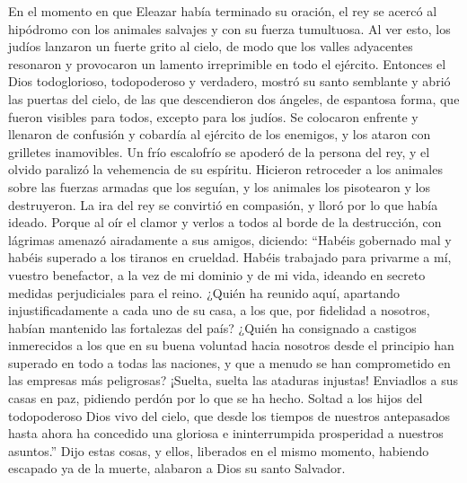  En el momento en que Eleazar había terminado su oración,
el rey se acercó al hipódromo con los animales salvajes y con su fuerza
tumultuosa.  Al ver esto, los judíos lanzaron un fuerte
grito al cielo, de modo que los valles adyacentes resonaron y provocaron
un lamento irreprimible en todo el ejército.  Entonces el
Dios todoglorioso, todopoderoso y verdadero, mostró su santo semblante y
abrió las puertas del cielo, de las que descendieron dos ángeles, de
espantosa forma, que fueron visibles para todos, excepto para los
judíos.  Se colocaron enfrente y llenaron de confusión y
cobardía al ejército de los enemigos, y los ataron con grilletes
inamovibles.  Un frío escalofrío se apoderó de la persona
del rey, y el olvido paralizó la vehemencia de su espíritu.
 Hicieron retroceder a los animales sobre las fuerzas
armadas que los seguían, y los animales los pisotearon y los
destruyeron.  La ira del rey se convirtió en compasión, y
lloró por lo que había ideado.  Porque al oír el clamor y
verlos a todos al borde de la destrucción, con lágrimas amenazó
airadamente a sus amigos, diciendo:  ``Habéis gobernado
mal y habéis superado a los tiranos en crueldad. Habéis trabajado para
privarme a mí, vuestro benefactor, a la vez de mi dominio y de mi vida,
ideando en secreto medidas perjudiciales para el reino. 
¿Quién ha reunido aquí, apartando injustificadamente a cada uno de su
casa, a los que, por fidelidad a nosotros, habían mantenido las
fortalezas del país?  ¿Quién ha consignado a castigos
inmerecidos a los que en su buena voluntad hacia nosotros desde el
principio han superado en todo a todas las naciones, y que a menudo se
han comprometido en las empresas más peligrosas? 
¡Suelta, suelta las ataduras injustas! Enviadlos a sus casas en paz,
pidiendo perdón por lo que se ha hecho.  Soltad a los
hijos del todopoderoso Dios vivo del cielo, que desde los tiempos de
nuestros antepasados hasta ahora ha concedido una gloriosa e
ininterrumpida prosperidad a nuestros asuntos.''  Dijo
estas cosas, y ellos, liberados en el mismo momento, habiendo escapado
ya de la muerte, alabaron a Dios su santo Salvador.

